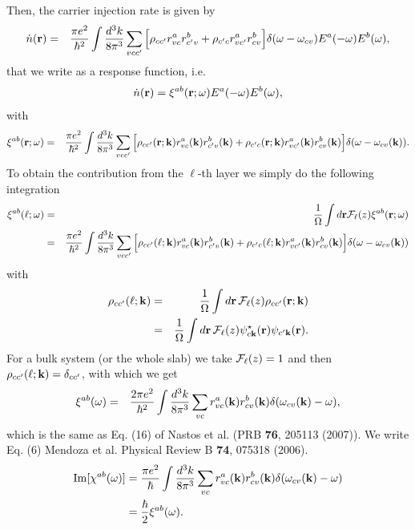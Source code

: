 \documentclass[floatfix,prb,aps,superscriptaddress,11pt]{revtex4}
\begin{document}
Then,
the carrier injection rate is given by
\begin{eqnarray}\label{m1}
\dot n(\mathbf{r})
&=&
\frac{\pi e^2}{\hbar^2}
\int\frac{d^3k}{8\pi^3}
\sum_{vcc'}
\Big[
\rho_{cc'}r^a_{vc} r^b_{c'v}
+
\rho_{c'c}r^a_{vc'} r^b_{cv}
\Big]
\delta(\omega-\omega_{cv}) 
E^a(-\omega) E^b(\omega)
,
\end{eqnarray} 
that we write as a response function, i.e.
\begin{equation}\label{rn}
\dot n(\mathbf{r})=\xi^{ab}(\mathbf{r};\omega)   
E^a(-\omega) E^b(\omega)  
,
\end{equation}  
with
\begin{eqnarray}\label{xir}
\xi^{ab}(\mathbf{r};\omega)
&=&
\frac{\pi e^2}{\hbar^2}
\int\frac{d^3k}{8\pi^3}
\sum_{vcc'}
\Big[
\rho_{cc'}(\mathbf{r};\mathbf{k})   
r^a_{vc} 
(\mathbf{k}) 
r^b_{c'v}
(\mathbf{k})
+
\rho_{c'c}(\mathbf{r};\mathbf{k})
r^a_{vc'} 
(\mathbf{k}) 
r^b_{cv}
(\mathbf{k})
\Big]
\delta(\omega-\omega_{cv}(\mathbf{k})
)
.
\end{eqnarray}  
To obtain the contribution from the $\ell$-th layer we simply do the
following integration
\begin{eqnarray}\label{xiz}
\xi^{ab}(\ell;\omega)&=&\frac{1}{\Omega}\int d\mathbf{r} {\cal F}_\ell(z)
\xi^{ab}(\mathbf{r};\omega)
\nonumber\\
&=&
\frac{\pi e^2}{\hbar^2}
\int\frac{d^3k}{8\pi^3}
\sum_{vcc'}
\Big[
\rho_{cc'}(\ell;\mathbf{k})    
r^a_{vc} 
(\mathbf{k})  
r^b_{c'v}
(\mathbf{k})
+
\rho_{c'c}(\ell;\mathbf{k}) 
r^a_{vc'} 
(\mathbf{k})  
r^b_{cv}
(\mathbf{k})
\Big]
\delta(\omega-\omega_{cv}(\mathbf{k})
)
\end{eqnarray}     
with
\begin{eqnarray}\label{rhoz1}
\rho_{cc'}(\ell;\mathbf{k})&=&
\frac{1}{\Omega}\int d\mathbf{r}\, {\cal F}_\ell(z)
\rho_{cc'}(\mathbf{r};\mathbf{k})
\nonumber\\
&=&
\frac{1}{\Omega}\int d\mathbf{r}\, {\cal F}_\ell(z)
\psi_{c\mathbf{k}}^\star(\mathbf{r})
\psi_{c'\mathbf{k}}(\mathbf{r})
.
\end{eqnarray}  
For a bulk system (or the whole slab) we take ${\cal F}_\ell(z)=1$ and then
$\rho_{cc'}(\ell;\mathbf{k})=\delta_{cc'}$, with which we get 
\begin{eqnarray}\label{xib}
\xi^{ab}(\omega)  
&=&
\frac{2\pi e^2}{\hbar^2}
\int\frac{d^3k}{8\pi^3}
\sum_{vc} 
r^a_{vc}(\mathbf{k}) r^b_{cv}(\mathbf{k})  
\delta(\omega_{cv}(\mathbf{k})-\omega)  
,
\end{eqnarray}   
which is the same as Eq. (16) of Nastos et al. (PRB {\bf 76}, 205113
(2007)). We write Eq. (6) Mendoza et al. Physical Review B {\bf 74},
075318 (2006).􏰵
\begin{align}\label{imchi}
\mathrm{Im}[\chi^{ab}(\omega)] 
&=
\frac{\pi e^2}{\hbar}
\int\frac{d^3k}{8\pi^3}
\sum_{vc}
r^a_{vc}(\mathbf{k}) r^b_{cv}(\mathbf{k}) 
\delta(\omega_{cv}(\mathbf{k})-\omega) 
\nonumber\\
&=\frac{\hbar}{2}\xi^{ab}(\omega).
\end{align}
\end{document}
